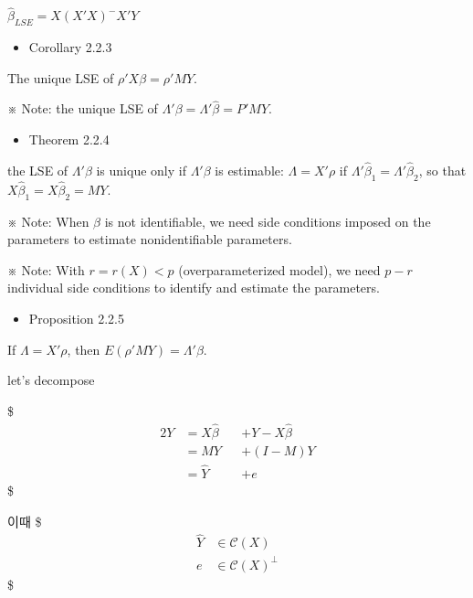 \documentclass[
]{book}
\providecommand{\tightlist}{%
  \setlength{\itemsep}{0pt}\setlength{\parskip}{0pt}}
\begin{document}
{{{\(\hat \beta_{LSE} = X(X'X)^{-}X' Y\)

\begin{itemize}
\tightlist
\item
  Corollary 2.2.3
\end{itemize}

The unique LSE of \(\rho ' X \beta = \rho ' M Y\).

※ Note: the unique LSE of \(\Lambda ' \beta = \Lambda ' \hat \beta = P' M Y\).

\begin{itemize}
\tightlist
\item
  Theorem 2.2.4
\end{itemize}

the LSE of \(\Lambda ' \beta\) is unique only if \(\Lambda ' \beta\) is estimable: \(\Lambda = X'\rho\) if \(\Lambda ' \hat \beta_1 =\Lambda ' \hat \beta_2\), so that \(X \hat \beta_1 = X \hat \beta_2 = MY\).

※ Note: When \(\beta\) is not identifiable, we need side conditions imposed on the parameters to estimate nonidentifiable parameters.

※ Note: With \(r = r (X) < p\) (overparameterized model), we need \(p - r\) individual side conditions to identify and estimate the parameters.

\begin{itemize}
\tightlist
\item
  Proposition 2.2.5
\end{itemize}

If \(\Lambda = X ' \rho\), then \(E(\rho ' MY) = \Lambda ' \beta\).

let's decompose

\$
\begin{alignat}{2}

Y 

&= X \hat \beta &&+ Y - X \hat \beta

\\


&= MY &&+ (I-M)Y

\\



&= \hat Y &&+ e 

\end{alignat}
\$

이때
\$
\begin{align}
\hat Y &\in \mathcal{C}(X) \tag{fitted values of Y} \\
e &\in \mathcal{C}(X)^{\perp} \tag{residuals}
\end{align}
\$

}}}
\end{document}
